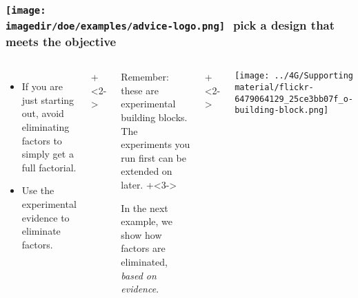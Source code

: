 \begin{frame}\frametitle{\texttt{[image: \\imagedir/doe/examples/advice-logo.png]}\,\, pick a design that meets the objective}
	
	\begin{columns}[T]
		
			\begin{itemize}
				\item	If you are just starting out, avoid eliminating factors to simply get a full factorial.
				\item	Use the experimental evidence to eliminate factors.
			\end{itemize}
			
			
			\vspace{1cm}
			\onslide+<2->{
				\begin{itemize}
					\item	Remember: these are experimental building blocks. The experiments you run first can be extended on later.
					\vspace{0.5cm}
					\onslide+<3->{
						\item	In the next example, we show how factors are eliminated, {\color{myOrange}\emph{based on evidence}}.
					}
				\end{itemize}
			}
	
			\vspace{1cm}
			
			\onslide+<2->{
				\centerline{\texttt{[image: ../4G/Supporting material/flickr-6479064129\_25ce3bb07f\_o-building-block.png]}}
		
			}
	\end{columns}
\end{frame}



